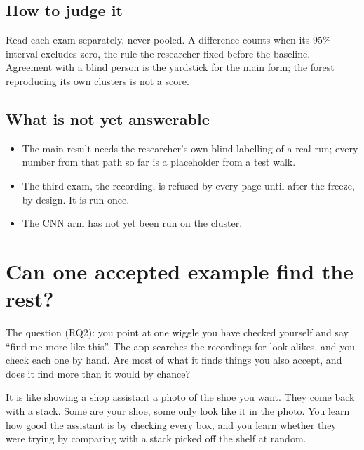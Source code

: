 \subsection*{How to judge it}
Read each exam separately, never pooled. A difference counts when its 95\% interval excludes
zero, the rule the researcher fixed before the baseline. Agreement with a blind person is the
yardstick for the main form; the forest reproducing its own clusters is not a score.

\subsection*{What is not yet answerable}
\begin{itemize}
\item The main result needs the researcher's own blind labelling of a real run; every number
  from that path so far is a placeholder from a test walk.
\item The third exam, the  recording, is refused by every page until
  after the freeze, by design. It is run once.
\item The CNN arm has not yet been run on the cluster.
\end{itemize}

\section{Can one accepted example find the rest?}\label{sec:workflows-rq2}
The question (RQ2): you point at one wiggle you have checked yourself and say ``find me more
like this''. The app searches the recordings for look-alikes, and you check each one by hand.
Are most of what it finds things you also accept, and does it find more than it would by
chance?

\begin{plainterms}
It is like showing a shop assistant a photo of the shoe you want. They come back with a stack.
Some are your shoe, some only look like it in the photo. You learn how good the assistant is
by checking every box, and you learn whether they were trying by comparing with a stack
picked off the shelf at random.
\end{plainterms}

